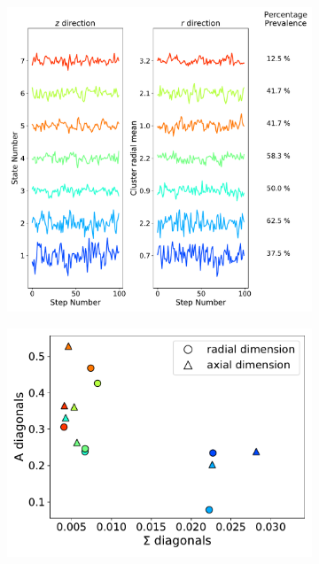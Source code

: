 \documentclass{article}
\begin{document}
  \begin{figure}
  \centering
  \begin{subfigure}{0.6\textwidth}
  \includegraphics[width=\textwidth]{common_states_MET.pdf}
  \caption{}\label{fig:common_states_MET_lines}
  \end{subfigure}
  \begin{subfigure}{0.35\textwidth}
  \includegraphics[width=\textwidth]{A_sigma_scatter_MET.pdf}

\end{subfigure}
\end{figure}
\end{document}
